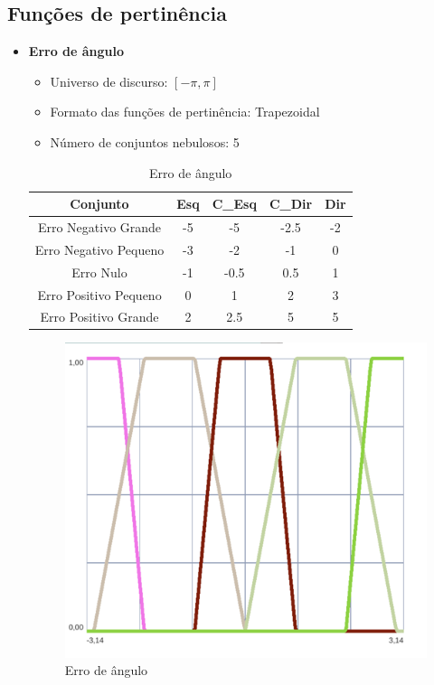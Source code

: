     \subsection{Funções de pertinência}
    \begin{itemize}
        \item{\bf{Erro de ângulo}}
            \begin{itemize}
                \item Universo de discurso: $[-\pi,\pi]$
                \item Formato das funções de pertinência: Trapezoidal
                \item Número de conjuntos nebulosos: 5
            \end{itemize}  
            
            \begin{table}[H]
                \centering
                \begin{tabular}{|c|c|c|c|c|}
                    \hline
                    Conjunto               & Esq   & C\_Esq & C\_Dir & Dir \\ \hline
                    Erro Negativo Grande   & -5    & -5    & -2.5  & -2    \\
                    Erro Negativo Pequeno  & -3    & -2    & -1    & 0     \\
                    Erro  Nulo             & -1    & -0.5  & 0.5   & 1     \\
                    Erro Positivo Pequeno  & 0     & 1     & 2     & 3     \\
                    Erro Positivo Grande   & 2     & 2.5   & 5     & 5     \\ \hline
                \end{tabular}
                \caption{Erro de ângulo}
            \end{table}

            \begin{figure}[H] 
                \centering
                \includegraphics[scale=0.7]{in_angulo.png}
                \caption{Erro de ângulo}
            \end{figure}
            

\end{itemize}
